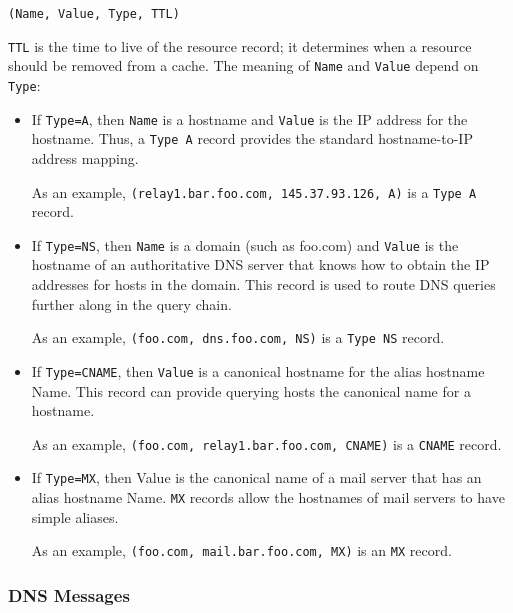 \documentclass[11pt]{article}
\begin{document}
\texttt{(Name, Value, Type, TTL)}

\texttt{TTL} is the time to live of the resource record; it determines when a resource should be removed from a cache.
The meaning of \texttt{Name} and \texttt{Value} depend on \texttt{Type}:

\begin{itemize}
	\item 
	
	If \texttt{Type=A}, then \texttt{Name} is a hostname and \texttt{Value} is the IP address for the hostname. Thus, a \texttt{Type A} record provides the standard hostname-to-IP address mapping. 
	
	As an example, \texttt{(relay1.bar.foo.com, 145.37.93.126, A)} is a \texttt{Type A} record.
	
	\item
	
	If \texttt{Type=NS}, then \texttt{Name} is a domain (such as foo.com) and \texttt{Value} is the hostname of an authoritative DNS server that knows how to obtain the IP addresses for hosts in the domain. This record is used to route DNS queries further along in the query chain. 
	
	As an example, \texttt{(foo.com, dns.foo.com, NS)} is a \texttt{Type NS} record.
	
	\item
	
	If \texttt{Type=CNAME}, then \texttt{Value} is a canonical hostname for the alias hostname Name. This record can provide querying hosts the canonical name for a hostname. 
	
	As an example, \texttt{(foo.com, relay1.bar.foo.com, CNAME)} is a \texttt{CNAME} record.
	
	\item
	
	If \texttt{Type=MX}, then Value is the canonical name of a mail server that has an alias hostname Name. \texttt{MX} records allow the hostnames of mail servers to have simple aliases.
	
	As an example, \texttt{(foo.com, mail.bar.foo.com, MX)} is an \texttt{MX} record. 
	
\end{itemize}

\subsubsection{DNS Messages}
\end{document}
